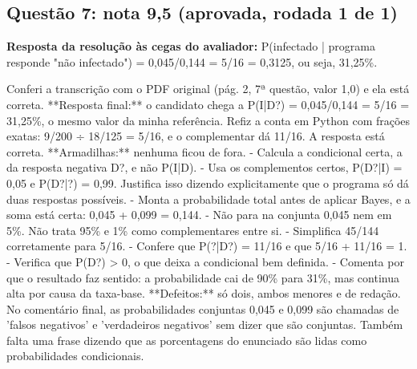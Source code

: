 \documentclass{article}%
\begin{document}
\subsection*{Questão 7: nota 9,5 (aprovada, rodada 1 de 1)}%
\textbf{Resposta da resolução às cegas do avaliador:} P(infectado | programa responde "não infectado") = 0,045/0,144 = 5/16 = 0,3125, ou seja, 31,25\%.\par %
Conferi a transcrição com o PDF original (pág. 2, 7ª questão, valor 1,0) e ela está correta.\newline%
\newline%
**Resposta final:** o candidato chega a P(I|D?) = 0,045/0,144 = 5/16 = 31,25\%, o mesmo valor da minha referência. Refiz a conta em Python com frações exatas: 9/200 ÷ 18/125 = 5/16, e o complementar dá 11/16. A resposta está correta.\newline%
\newline%
**Armadilhas:** nenhuma ficou de fora.\newline%
{-} Calcula a condicional certa, a da resposta negativa D?, e não P(I|D).\newline%
{-} Usa os complementos certos, P(D?|I) = 0,05 e P(D?|?) = 0,99. Justifica isso dizendo explicitamente que o programa só dá duas respostas possíveis.\newline%
{-} Monta a probabilidade total antes de aplicar Bayes, e a soma está certa: 0,045 + 0,099 = 0,144.\newline%
{-} Não para na conjunta 0,045 nem em 5\%. Não trata 95\% e 1\% como complementares entre si.\newline%
{-} Simplifica 45/144 corretamente para 5/16.\newline%
{-} Confere que P(?|D?) = 11/16 e que 5/16 + 11/16 = 1.\newline%
{-} Verifica que P(D?) > 0, o que deixa a condicional bem definida.\newline%
{-} Comenta por que o resultado faz sentido: a probabilidade cai de 90\% para 31\%, mas continua alta por causa da taxa{-}base.\newline%
\newline%
**Defeitos:** só dois, ambos menores e de redação. No comentário final, as probabilidades conjuntas 0,045 e 0,099 são chamadas de 'falsos negativos' e 'verdadeiros negativos' sem dizer que são conjuntas. Também falta uma frase dizendo que as porcentagens do enunciado são lidas como probabilidades condicionais.\newline%
\newline%
\end{document}
